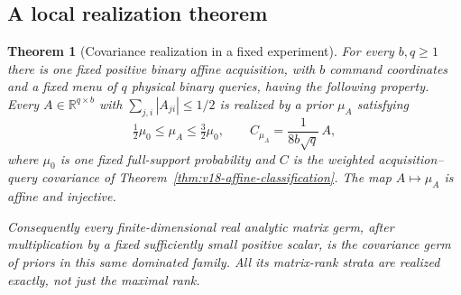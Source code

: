 \documentclass[11pt]{amsart}
\newtheorem{theorem}{Theorem}[section]
\theoremstyle{definition}\newtheorem{definition}[theorem]{Definition}
\theoremstyle{remark}\newtheorem{remark}[theorem]{Remark}
\newcommand{\R}{\mathbb R}\newcommand{\N}{\mathbb N}\newcommand{\C}{\mathbb C}
\begin{document}
\subsection{A local realization theorem}
\begin{theorem}[Covariance realization in a fixed experiment]
\label{thm:v19-covariance-realization}
For every $b,q\ge1$ there is one fixed positive binary affine
acquisition, with $b$ command coordinates and a fixed menu of $q$
physical binary queries, having the following property. Every
$A\in\R^{q\times b}$ with $\sum_{j,i}|A_{ji}|\le1/2$ is realized
by a prior $\mu_A$ satisfying
\begin{equation}\label{eq:v19-density-envelope}
 \tfrac12\mu_0\le\mu_A\le\tfrac32\mu_0,
 \qquad C_{\mu_A}=\frac{1}{8b\sqrt q}\,A,
\end{equation}
where $\mu_0$ is one fixed full-support probability and $C$ is the
weighted acquisition--query covariance of
Theorem~\ref{thm:v18-affine-classification}.
The map $A\mapsto\mu_A$ is affine and injective.

Consequently every finite-dimensional real analytic matrix germ, after
multiplication by a fixed sufficiently small positive scalar, is the
covariance germ of priors in this same dominated family. All its
matrix-rank strata are realized exactly, not just the maximal rank.
\end{theorem}
\end{document}
